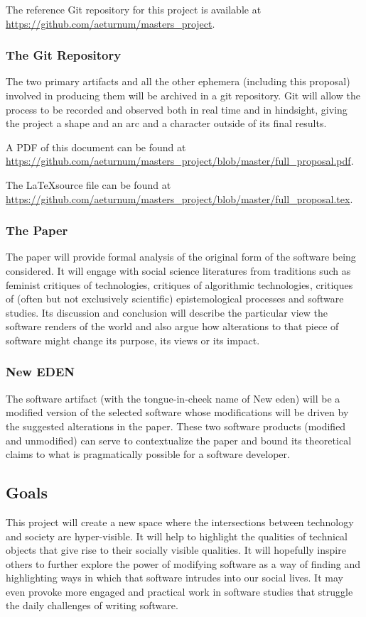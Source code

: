 \documentclass[a4paper,man,natbib]{apa6}
\begin{document}
   The reference Git repository for this project is available at \url{https://github.com/aeturnum/masters_project}.
   \subsubsection*{The Git Repository}
   The two primary artifacts and all the other ephemera (including this proposal) involved in producing them will be archived in a git repository. Git will allow the process to be recorded and observed both in real time and in hindsight, giving the project a shape and an arc and a character outside of its final results. 

   A PDF of this document can be found at \url{https://github.com/aeturnum/masters_project/blob/master/full_proposal.pdf}.

   The \LaTeX source file can be found at \url{https://github.com/aeturnum/masters_project/blob/master/full_proposal.tex}.

   \subsubsection*{The Paper}
   The paper will provide formal analysis of the original form of the software being considered. It will engage with social science literatures from traditions such as feminist critiques of technologies, critiques of algorithmic technologies, critiques of (often but not exclusively scientific) epistemological processes and software studies. Its discussion and conclusion will describe the particular view the software renders of the world and also argue how alterations to that piece of software might change its purpose, its views or its impact.

   \subsubsection*{New EDEN}
   The software artifact (with the tongue-in-cheek name of New \acrshort{eden}) will be a modified version of the selected software whose modifications will be driven by the suggested alterations in the paper. These two software products (modified and unmodified) can serve to contextualize the paper and bound its theoretical claims to what is pragmatically possible for a software developer.

   \subsection*{Goals}
   This project will create a new space where the intersections between technology and society are hyper-visible. It will help to highlight the qualities of technical objects that give rise to their socially visible qualities. It will hopefully inspire others to further explore the power of modifying software as a way of finding and highlighting ways in which that software intrudes into our social lives. It may even provoke more engaged and practical work in software studies that struggle the daily challenges of writing software.

   \newpage
   \printnoidxglossaries

   \newpage
   \setlength{\parindent}{4em}
   
\end{document}
